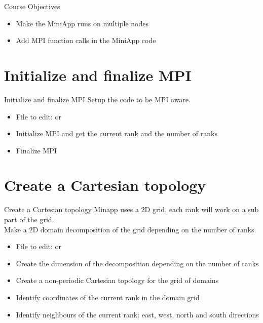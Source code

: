 \documentclass[aspectratio=43]{beamer}
\begin{document}
\cscstitle

\begin{frame}{Course Objectives}
\begin{itemize}
\item Make the MiniApp runs on multiple nodes
\item Add MPI function calls in the MiniApp code
\end{itemize}
\end{frame}



\section{Initialize and finalize MPI}
\begin{frame}[fragile]{Initialize and finalize MPI}
Setup the code to be MPI aware.
\begin{itemize}
\item File to edit:  or 
\item Initialize MPI and get the current rank and the number of ranks
\item Finalize MPI
\end{itemize}
\end{frame}

\section{Create a Cartesian topology}
\begin{frame}[fragile]{Create a Cartesian topology}
Minapp uses a 2D grid, each rank will work on a sub part of the grid.\\
Make a 2D domain decomposition of the grid depending on the number of ranks.\\
\begin{itemize}
\item File to edit:  or 
\item Create the dimension of the decomposition depending on the number of ranks
\item Create a non-periodic Cartesian topology for the grid of domains
\item Identify coordinates of the current rank in the domain grid
\item Identify neighbours of the current rank: east, west, north and south directions
\end{itemize}
\end{frame}
\end{document}
